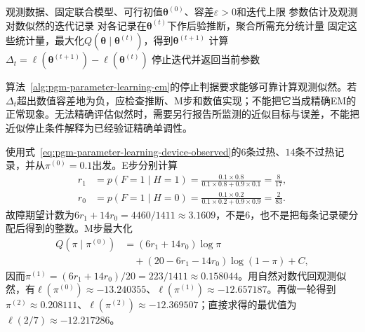 \begin{algorithm}[利用后验充分统计量的EM]
  \label{alg:pgm-parameter-learning-em}
  \begin{algorithmic}[1]
    \Require 观测数据、固定联合模型、可行初值$\bm{\theta}^{(0)}$、容差$\varepsilon>0$和迭代上限
    \Ensure 参数估计及观测对数似然的迭代记录
      \State 对各记录在$\bm{\theta}^{(t)}$下作后验推断，聚合所需充分统计量
      \State 固定这些统计量，最大化$Q(\bm{\theta}\mid\bm{\theta}^{(t)})$，得到$\bm{\theta}^{(t+1)}$
      \State 计算$\Delta_t=\ell(\bm{\theta}^{(t+1)})-\ell(\bm{\theta}^{(t)})$
        \State 停止迭代并返回当前参数
      \EndIf
    \EndFor
  \end{algorithmic}
\end{algorithm}

算法~\ref{alg:pgm-parameter-learning-em}的停止判据要求能够可靠计算观测似然。若$\Delta_t$超出数值容差地为负，应检查推断、M步和数值实现；不能把它当成精确EM的正常现象。无法精确评估似然时，需要另行报告所监测的近似目标与误差，不能把近似停止条件解释为已经验证精确单调性。

\begin{example}[由过热记录学习故障率]
  \label{ex:pgm-parameter-learning-device-em}
  使用式~\eqref{eq:pgm-parameter-learning-device-observed}的$6$条过热、$14$条不过热记录，并从$\pi^{(0)}=0.1$出发。E步分别计算
  \[
    \begin{aligned}
      r_1&=p(F=1\mid H=1)
        =\frac{0.1\times0.8}{0.1\times0.8+0.9\times0.1}
        =\frac{8}{17},\\
      r_0&=p(F=1\mid H=0)
        =\frac{0.1\times0.2}{0.1\times0.2+0.9\times0.9}
        =\frac{2}{83}.
    \end{aligned}
  \]
  故障期望计数为$6r_1+14r_0=4460/1411\approx3.1609$，不是$6$，也不是把每条记录硬分配后得到的整数。M步最大化
  \[
    \begin{aligned}
      Q(\pi\mid\pi^{(0)})
        &=(6r_1+14r_0)\log\pi\\
        &\quad+(20-6r_1-14r_0)\log(1-\pi)+C,
    \end{aligned}
  \]
  因而$\pi^{(1)}=(6r_1+14r_0)/20=223/1411\approx0.158044$。用自然对数代回观测似然，有$\ell(\pi^{(0)})\approx-13.240355$、$\ell(\pi^{(1)})\approx-12.657187$。再做一轮得到$\pi^{(2)}\approx0.208111$、$\ell(\pi^{(2)})\approx-12.369507$；直接求得的最优值为$\ell(2/7)\approx-12.217286$。
\end{example}

